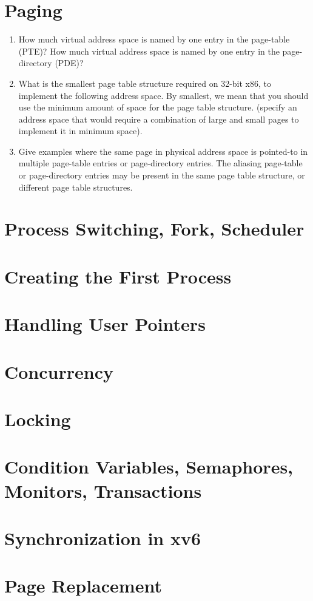 \section{Paging}
\begin{enumerate}
\item How much virtual address space is named by one entry in the page-table (PTE)? How
much virtual address space is named by one entry in the page-directory (PDE)?
\item What is the smallest page table structure required on 32-bit
x86, to implement the following
address space. By smallest, we mean that you should use the minimum amount
of space for the page table structure. (specify an address space that would require
a combination of large and small pages to implement it in minimum space).
\item Give examples where the same page in physical address space is pointed-to in
multiple page-table entries or page-directory entries. The aliasing
page-table or page-directory entries may be
present in the same page table structure, or different page table structures.
\end{enumerate}

\section{Process Switching, Fork, Scheduler}
\section{Creating the First Process}
\section{Handling User Pointers}
\section{Concurrency}
\section{Locking}
\section{Condition Variables, Semaphores, Monitors, Transactions}
\section{Synchronization in xv6}
\section{Page Replacement}
